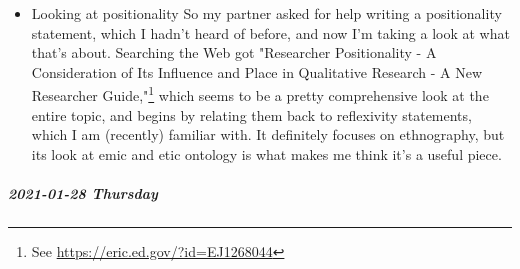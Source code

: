 \documentclass[11pt]{article}
\begin{document}
\begin{itemize}
And as for jealousy? As I was writing this, I heard that today the White House was discussing stimulus checks, something which previously wasn't immediately on the table. (The executive actions so far have been to prepare for the establishment of work programs, the Green New Deal). But as of today, apparently, there's an urgent interest in distributing, what I heard, \$2,000 a month.

And the only reason a hedge fund didn't go bankrupt is because two other funds gave them the money they needed.

That's more harm to Wall Street than Occupy Wall Street ever did, and even before last week I've seen a couple dozen people talking about using their "meme stock" profits to pay off loans, help with family medical bills, etc. Compared to setting up GoFundMes and paying into bail funds, it's really hard to argue that the meme stock stuff is radical.

The question is simply whether it's accelerationist, revolutionary, or insurrectionary. And that's a question that our actions help dictate the answer to.

\begin{quote}
No [one] but the struggling, oppressed class itself is the [vessel] of historical knowledge.\footnote{"On the Concept of History," by Walter Benjamin; Section 12 paragraph 1}
\end{quote}
\item Looking at positionality
\label{sec:org6198e72}
So my partner asked for help writing a positionality statement, which I hadn't heard of before, and now I'm taking a look at what that's about. Searching the Web got "Researcher Positionality - A Consideration of Its Influence and Place in Qualitative Research - A New Researcher Guide,"\footnote{See \url{https://eric.ed.gov/?id=EJ1268044}} which seems to be a pretty comprehensive look at the entire topic, and begins by relating them back to reflexivity statements, which I am (recently) familiar with. It definitely focuses on ethnography, but its look at emic and etic ontology is what makes me think it's a useful piece.
\end{itemize}
\subparagraph*{2021-01-28 Thursday}
\label{sec:orgb58de79}
\end{document}
